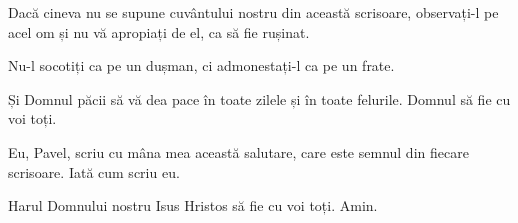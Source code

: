 {Dacă cineva nu se supune cuvântului nostru din această scrisoare, observați-l pe acel om și nu vă apropiați de el, ca să fie rușinat.

Nu-l socotiți ca pe un dușman, ci admonestați-l ca pe un frate.


\par }{\PP {}Și Domnul păcii să vă dea pace în toate zilele și în toate felurile. Domnul să fie cu voi toți.


\par }{\PP {}Eu, Pavel, scriu cu mâna mea această salutare, care este semnul din fiecare scrisoare. Iată cum scriu eu.

Harul Domnului nostru Isus Hristos să fie cu voi toți. Amin.


\par }